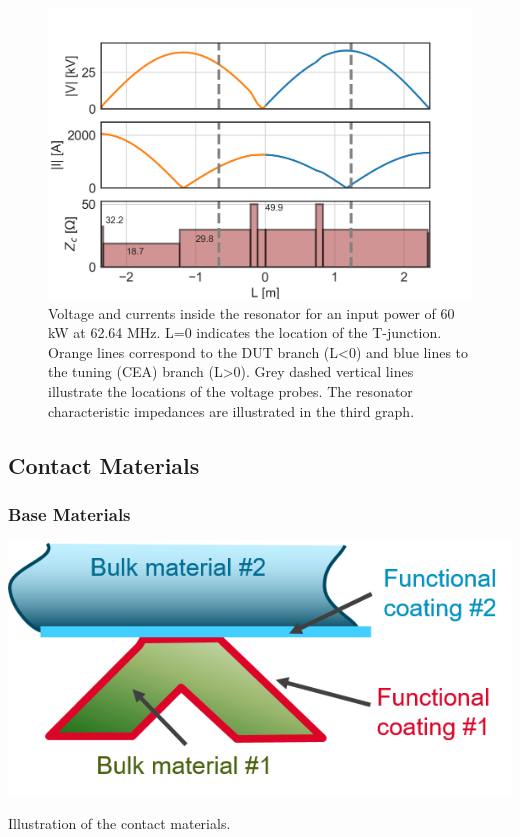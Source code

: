 {\begin{figure}[h]
	\centering
	\includegraphics[width=1.0\linewidth]{figures/chap3/RF_contacts/RF_contact_Tresonator_current_voltage}
	\caption{Voltage and currents inside the resonator for an input power of 60 kW at 62.64 MHz. L=0 indicates the location of the T-junction. Orange lines correspond to the DUT branch (L<0) and blue lines to the tuning (CEA) branch (L>0). Grey dashed vertical lines illustrate the locations of the voltage probes. The resonator characteristic impedances are illustrated in the third graph.}
	\label{fig:rfcontacttresonatorcurrentvoltage}
\end{figure}


\clearpage

\subsection{Contact Materials}
\subsubsection{Base Materials}

\begin{marginfigure}
	\centering
	\includegraphics[width=1.0\linewidth]{figures/chap3/RF_contacts/RF_contact_materials}
	\caption{Illustration of the contact materials.}
	\label{fig:rfcontactmaterials}
\end{marginfigure}

}

